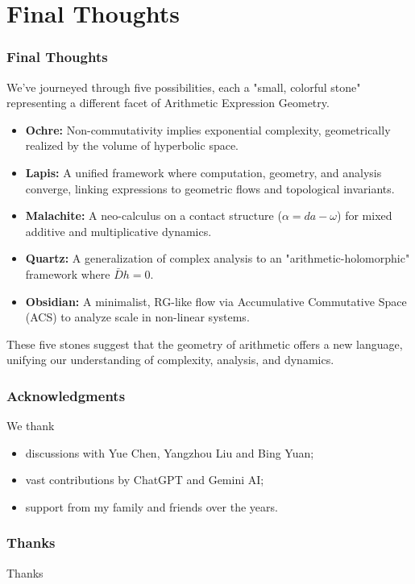 \documentclass[aspectratio=169]{beamer}
\begin{document}

\section{Final Thoughts}

\begin{frame}
    \frametitle{Final Thoughts}
    We've journeyed through five possibilities, each a "small, colorful stone" representing a different facet of Arithmetic Expression Geometry.
    \begin{itemize}
        \item \textbf{Ochre:} Non-commutativity implies exponential complexity, geometrically realized by the volume of hyperbolic space.
        \item \textbf{Lapis:} A unified framework where computation, geometry, and analysis converge, linking expressions to geometric flows and topological invariants.
        \item \textbf{Malachite:} A neo-calculus on a contact structure ($\alpha = da - \omega$) for mixed additive and multiplicative dynamics.
        \item \textbf{Quartz:} A generalization of complex analysis to an "arithmetic-holomorphic" framework where $\bar{D}h=0$.
        \item \textbf{Obsidian:} A minimalist, RG-like flow via Accumulative Commutative Space (ACS) to analyze scale in non-linear systems.
    \end{itemize}

    These five stones suggest that the geometry of arithmetic offers a new language, unifying our understanding of complexity, analysis, and dynamics.
\end{frame}

\begin{frame}
    \frametitle{Acknowledgments}
    We thank
    \begin{itemize}
        \item discussions with Yue Chen, Yangzhou Liu and Bing Yuan;
        \item vast contributions by ChatGPT and Gemini AI;
        \item support from my family and friends over the years.
    \end{itemize}
\end{frame}

\begin{frame}
    \frametitle{Thanks}
    \centerline{Thanks}
\end{frame}
\end{document}
